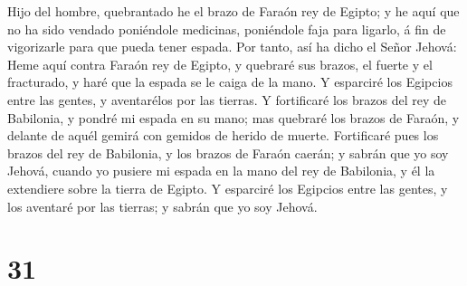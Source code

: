  Hijo del hombre, quebrantado he el brazo de Faraón rey
de Egipto; y he aquí que no ha sido vendado poniéndole medicinas,
poniéndole faja para ligarlo, á fin de vigorizarle para que pueda tener
espada.  Por tanto, así ha dicho el Señor Jehová: Heme
aquí contra Faraón rey de Egipto, y quebraré sus brazos, el fuerte y el
fracturado, y haré que la espada se le caiga de la mano. 
Y esparciré los Egipcios entre las gentes, y aventarélos por las
tierras.  Y fortificaré los brazos del rey de Babilonia,
y pondré mi espada en su mano; mas quebraré los brazos de Faraón, y
delante de aquél gemirá con gemidos de herido de muerte. 
Fortificaré pues los brazos del rey de Babilonia, y los brazos de Faraón
caerán; y sabrán que yo soy Jehová, cuando yo pusiere mi espada en la
mano del rey de Babilonia, y él la extendiere sobre la tierra de Egipto.
 Y esparciré los Egipcios entre las gentes, y los
aventaré por las tierras; y sabrán que yo soy Jehová.

\hypertarget{section-30}{%
\section{31}\label{section-30}}

